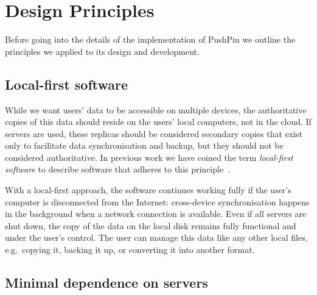 \documentclass[sigplan,10pt]{acmart}
\begin{document}



\section{Design Principles}\label{sec:principles}

Before going into the details of the implementation of PushPin we outline the principles we applied to its design and development.

\subsection{Local-first software}

While we want users' data to be accessible on multiple devices, the authoritative copies of this data should reside on the users' local computers, not in the cloud.
If servers are used, these replicas should be considered secondary copies that exist only to facilitate data synchronisation and backup, but they should not be considered authoritative.
In previous work we have coined the term \emph{local-first software} to describe software that adheres to this principle~\cite{LocalFirst}.

With a local-first approach, the software continues working fully if the user's computer is disconnected from the Internet: cross-device synchronisation happens in the background when a network connection is available.
Even if all servers are shut down, the copy of the data on the local disk remains fully functional and under the user's control.
The user can manage this data like any other local files, e.g.\ copying it, backing it up, or converting it into another format.

\subsection{Minimal dependence on servers}
\end{document}
